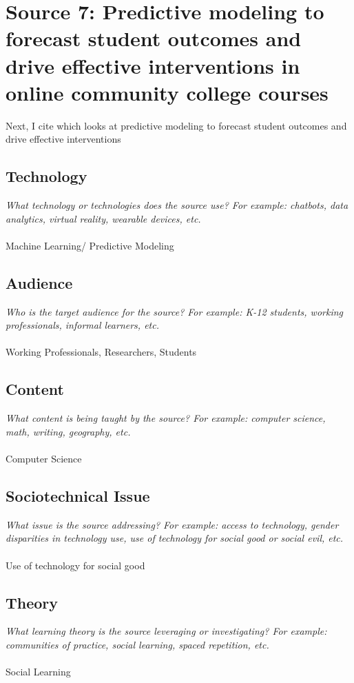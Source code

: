 \documentclass[12pt, final]{article}
\begin{document}
\section{Source 7: Predictive modeling to forecast student outcomes and drive effective interventions in online community college courses}
\label{Source 7}

Next, I cite \cite{Smith} which looks at predictive modeling to forecast student outcomes and drive effective interventions

\subsection{Technology}
\textit{What technology or technologies does the source use? For example: chatbots, data analytics, virtual reality, wearable devices, etc.}
\\
\\
Machine Learning/ Predictive Modeling

\subsection{Audience}
\textit{Who is the target audience for the source? For example: K-12 students, working professionals, informal learners, etc.}
\\
\\
Working Professionals, Researchers, Students

\subsection{Content}
\textit{What content is being taught by the source? For example: computer science, math, writing, geography, etc.}
\\
\\
Computer Science

\subsection{Sociotechnical Issue}
\textit{What issue is the source addressing? For example: access to technology, gender disparities in technology use, use of technology for social good or social evil, etc.}
\\
\\
Use of technology for social good

\subsection{Theory}
\textit{What learning theory is the source leveraging or investigating? For example: communities of practice, social learning, spaced repetition, etc.}
\\
\\
Social Learning
\end{document}
